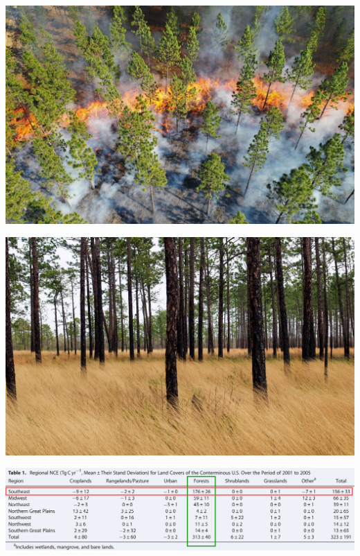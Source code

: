 \documentclass[oneside,a4paper,11pt,explicit]{book}
\begin{document}
\begin{tcolorbox}[colback=yellow!5!white,colframe=IceCreamLeaf,title=\textbf{Southern Pine Forests}]
	\begin{multicols}{2}

	\centerline{\includegraphics[width=.975\columnwidth]{SPineBurn.jpeg}}
	\centerline{\includegraphics[width=.975\columnwidth]{SPineGrass.jpg}}
	\centerline{\includegraphics[width=.975\columnwidth]{CarbonForestUSRegions.png}}


\end{multicols}
\end{tcolorbox}
\end{document}
